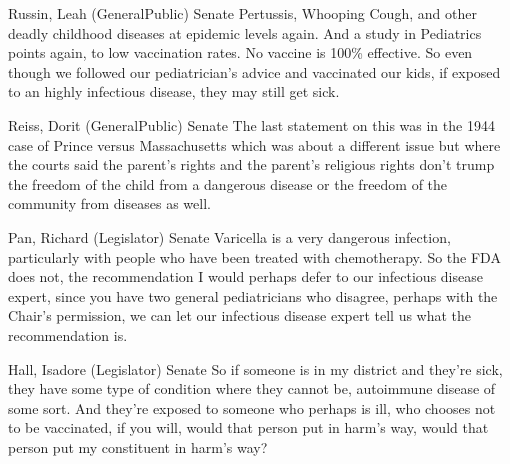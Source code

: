 \begin{result}{7.460884752487668}{Russin, Leah (GeneralPublic) Senate}
Pertussis, Whooping Cough, and other deadly childhood diseases at epidemic levels again. And a study in Pediatrics points again, to low vaccination rates. No vaccine is 100\% effective. So even though we followed our pediatrician's advice and vaccinated our kids, if exposed to an highly infectious disease, they may still get sick.
\end{result}

\begin{result}{7.2673007812919455}{Reiss, Dorit (GeneralPublic) Senate}
The last statement on this was in the 1944 case of Prince versus Massachusetts which was about a different issue but where the courts said the parent's rights and the parent's religious rights don't trump the freedom of the child from a dangerous disease or the freedom of the community from diseases as well.
\end{result}

\begin{result}{6.680218306456022}{Pan, Richard (Legislator) Senate}
Varicella is a very dangerous infection, particularly with people who have been treated with chemotherapy. So the FDA does not, the recommendation I would perhaps defer to our infectious disease expert, since you have two general pediatricians who disagree, perhaps with the Chair's permission, we can let our infectious disease expert tell us what the recommendation is.
\end{result}

\begin{result}{6.553086576413747}{Hall, Isadore (Legislator) Senate}
So if someone is in my district and they're sick, they have some type of condition where they cannot be, autoimmune disease of some sort. And they're exposed to someone who perhaps is ill, who chooses not to be vaccinated, if you will, would that person put in harm's way, would that person put my constituent in harm's way?
\end{result}

